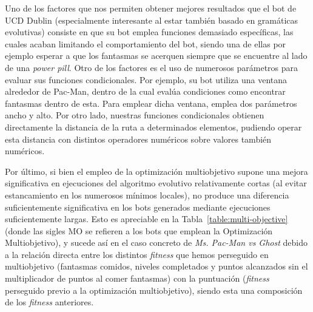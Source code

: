 Uno de los factores que nos permiten obtener mejores resultados que el bot de UCD Dublin \cite{galvan2010evolving} (especialmente interesante al estar también basado en gramáticas evolutivas) consiste en que su bot emplea funciones demasiado específicas, las cuales acaban limitando el comportamiento del bot, siendo una de ellas por ejemplo esperar a que los fantasmas se acerquen siempre que se encuentre al lado de una \textit{power pill}. 
Otro de los factores es el uso de numerosos parámetros para evaluar sus funciones condicionales. Por ejemplo, su bot utiliza una ventana alrededor de Pac-Man, dentro de la cual evalúa condiciones como encontrar fantasmas dentro de esta. Para emplear dicha ventana, emplea dos parámetros ancho y alto. Por otro lado, nuestras funciones condicionales obtienen directamente la distancia de la ruta a determinados elementos, pudiendo operar esta distancia con distintos operadores numéricos sobre valores también numéricos.

Por último, si bien el empleo de la optimización multiobjetivo supone una mejora significativa en ejecuciones del algoritmo evolutivo relativamente cortas (al evitar estancamiento en los numerosos mínimos locales), no produce una diferencia suficientemente significativa en los bots generados mediante ejecuciones suficientemente largas. Esto es apreciable en la Tabla~\ref{table:multi-objective} (donde las sigles MO se refieren a los bots que emplean la Optimización Multiobjetivo), y sucede así en el caso concreto de \textit{Ms. Pac-Man vs Ghost} debido a la relación directa entre los distintos \textit{fitness} que hemos perseguido en multiobjetivo (fantasmas comidos, niveles completados y puntos alcanzados sin el multiplicador de puntos al comer fantasmas) con la puntuación (\textit{fitness} perseguido previo a la optimización multiobjetivo), siendo esta una composición de los \textit{fitness} anteriores.

